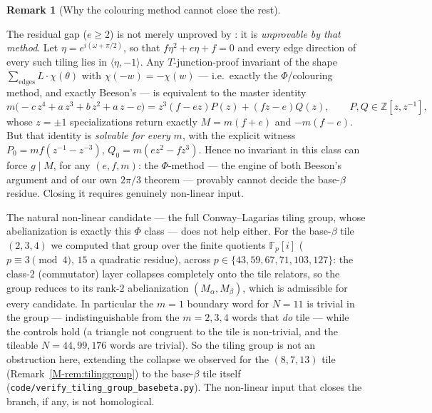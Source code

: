 \documentclass[11pt,reqno]{amsart}
\theoremstyle{plain}
\theoremstyle{definition}
\newtheorem{remark}[theorem]{Remark}
\newcommand{\Z}{\mathbb{Z}}
\begin{document}
\begin{remark}[Why the colouring method cannot close the rest]\label{OM-nogo}

The residual gap ($e\ge2$) is not merely unproved by \cite[Thm.~14]{BeesonIII}: it is
\emph{unprovable by that method}. Let $\eta=e^{i(\omega+\pi/2)}$, so that $f\eta^2+e\eta+f=0$ and
every edge direction of every such tiling lies in $\langle\eta,-1\rangle$. Any $T$-junction-proof
invariant of the shape $\sum_{\text{edges}}L\cdot\chi(\theta)$ with $\chi(-w)=-\chi(w)$ --- i.e.\
exactly the $\Phi$/colouring method, and exactly Beeson's --- is equivalent to the master identity
\[
m\bigl(-c\,z^4+a\,z^3+b\,z^2+a\,z-c\bigr)=z^3(f-ez)P(z)+(fz-e)Q(z),
\qquad P,Q\in\Z[z,z^{-1}],
\]
whose $z=\pm1$ specializations return exactly $M=m(f+e)$ and $-m(f-e)$. But that identity is
\emph{solvable for every} $m$, with the explicit witness $P_0=mf(z^{-1}-z^{-3})$,
$Q_0=m(ez^2-fz^3)$. Hence no invariant in this class can force $g\mid M$, for any $(e,f,m)$: the
$\Phi$-method --- the engine of both Beeson's argument and of our own $2\pi/3$ theorem --- provably
cannot decide the base-$\beta$ residue. Closing it requires genuinely non-linear input.

The natural non-linear candidate --- the full Conway--Lagarias tiling group, whose abelianization is
exactly this $\Phi$ class --- does not help either. For the base-$\beta$ tile $(2,3,4)$ we computed
that group over the finite quotients $\mathbb F_p[i]$ ($p\equiv3\pmod4$, $15$ a quadratic residue),
across $p\in\{43,59,67,71,103,127\}$: the class-$2$ (commutator) layer collapses completely onto the
tile relators, so the group reduces to its rank-$2$ abelianization $(M_\alpha,M_\beta)$, which is
admissible for every candidate. In particular the $m=1$ boundary word for $N=11$ is trivial in the
group --- indistinguishable from the $m=2,3,4$ words that \emph{do} tile --- while the controls hold
(a triangle not congruent to the tile is non-trivial, and the tileable $N=44,99,176$ words are
trivial). So the tiling group is not an obstruction here, extending the collapse we observed for the
$(8,7,13)$ tile (Remark~\ref{M-rem:tilinggroup}) to the base-$\beta$ tile itself
(\texttt{code/verify\_tiling\_group\_basebeta.py}). The non-linear input that closes the branch, if
any, is not homological.


\end{remark}
\end{document}

